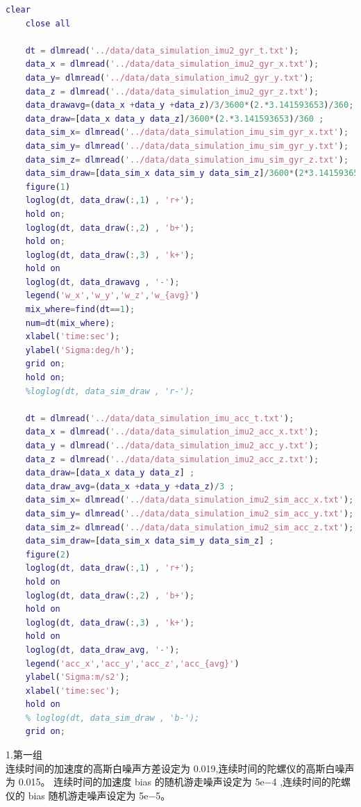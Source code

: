\documentclass[UTF8]{ctexart}
\begin{document}
\begin{lstlisting}[language={matlab}]
    clear 
    close all
    
    dt = dlmread('../data/data_simulation_imu2_gyr_t.txt');         
    data_x = dlmread('../data/data_simulation_imu2_gyr_x.txt'); 
    data_y= dlmread('../data/data_simulation_imu2_gyr_y.txt'); 
    data_z = dlmread('../data/data_simulation_imu2_gyr_z.txt'); 
    data_drawavg=(data_x +data_y +data_z)/3/3600*(2.*3.141593653)/360;
    data_draw=[data_x data_y data_z]/3600*(2.*3.141593653)/360 ;
    data_sim_x= dlmread('../data/data_simulation_imu_sim_gyr_x.txt'); 
    data_sim_y= dlmread('../data/data_simulation_imu_sim_gyr_y.txt'); 
    data_sim_z= dlmread('../data/data_simulation_imu_sim_gyr_z.txt'); 
    data_sim_draw=[data_sim_x data_sim_y data_sim_z]/3600*(2*3.141593653)/360 ;
    figure(1)
    loglog(dt, data_draw(:,1) , 'r+');
    hold on;  
    loglog(dt, data_draw(:,2) , 'b+');
    hold on;  
    loglog(dt, data_draw(:,3) , 'k+');
    hold on 
    loglog(dt, data_drawavg , '-');
    legend('w_x','w_y','w_z','w_{avg}')
    mix_where=find(dt==1);
    num=dt(mix_where);
    xlabel('time:sec');                
    ylabel('Sigma:deg/h');   
    grid on;                           
    hold on;  
    %loglog(dt, data_sim_draw , 'r-');
    
    dt = dlmread('../data/data_simulation_imu_acc_t.txt');         
    data_x = dlmread('../data/data_simulation_imu2_acc_x.txt'); 
    data_y = dlmread('../data/data_simulation_imu2_acc_y.txt'); 
    data_z = dlmread('../data/data_simulation_imu2_acc_z.txt'); 
    data_draw=[data_x data_y data_z] ;
    data_draw_avg=(data_x +data_y +data_z)/3 ;
    data_sim_x= dlmread('../data/data_simulation_imu2_sim_acc_x.txt'); 
    data_sim_y= dlmread('../data/data_simulation_imu2_sim_acc_y.txt'); 
    data_sim_z= dlmread('../data/data_simulation_imu2_sim_acc_z.txt'); 
    data_sim_draw=[data_sim_x data_sim_y data_sim_z] ;
    figure(2)
    loglog(dt, data_draw(:,1) , 'r+');
    hold on
    loglog(dt, data_draw(:,2) , 'b+');
    hold on
    loglog(dt, data_draw(:,3) , 'k+');
    hold on
    loglog(dt, data_draw_avg, '-');
    legend('acc_x','acc_y','acc_z','acc_{avg}')
    ylabel('Sigma:m/s2');   
    xlabel('time:sec');   
    hold on
    % loglog(dt, data_sim_draw , 'b-');
    grid on;
\end{lstlisting}
1.第一组\\
\indent 连续时间的加速度的高斯白噪声方差设定为 0.019,连续时间的陀螺仪的高斯白噪声为 0.015。 连续时间的加速度 bias 的随机游走噪声设定为
5e−4 ,连续时间的陀螺仪的 bias 随机游走噪声设定为 5e−5。\\
\end{document}
